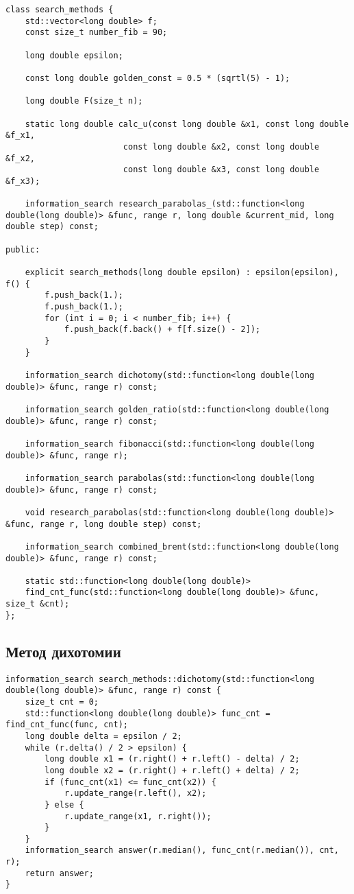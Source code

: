 \begin{lstlisting}
class search_methods {
    std::vector<long double> f;
    const size_t number_fib = 90;

    long double epsilon;

    const long double golden_const = 0.5 * (sqrtl(5) - 1);

    long double F(size_t n);

    static long double calc_u(const long double &x1, const long double &f_x1,
                        const long double &x2, const long double &f_x2,
                        const long double &x3, const long double &f_x3);

    information_search research_parabolas_(std::function<long double(long double)> &func, range r, long double &current_mid, long double step) const;

public:

    explicit search_methods(long double epsilon) : epsilon(epsilon), f() {
        f.push_back(1.);
        f.push_back(1.);
        for (int i = 0; i < number_fib; i++) {
            f.push_back(f.back() + f[f.size() - 2]);
        }
    }

    information_search dichotomy(std::function<long double(long double)> &func, range r) const;

    information_search golden_ratio(std::function<long double(long double)> &func, range r) const;

    information_search fibonacci(std::function<long double(long double)> &func, range r);

    information_search parabolas(std::function<long double(long double)> &func, range r) const;

    void research_parabolas(std::function<long double(long double)> &func, range r, long double step) const;

    information_search combined_brent(std::function<long double(long double)> &func, range r) const;

    static std::function<long double(long double)>
    find_cnt_func(std::function<long double(long double)> &func, size_t &cnt);
};
\end{lstlisting}

\subsection {Метод дихотомии}

\begin{lstlisting}
information_search search_methods::dichotomy(std::function<long double(long double)> &func, range r) const {
	size_t cnt = 0;
	std::function<long double(long double)> func_cnt = find_cnt_func(func, cnt);
	long double delta = epsilon / 2;
	while (r.delta() / 2 > epsilon) {
		long double x1 = (r.right() + r.left() - delta) / 2;
		long double x2 = (r.right() + r.left() + delta) / 2;
		if (func_cnt(x1) <= func_cnt(x2)) {
			r.update_range(r.left(), x2);
		} else {
			r.update_range(x1, r.right());
		}
	}
	information_search answer(r.median(), func_cnt(r.median()), cnt, r);
	return answer;
}
\end{lstlisting}

